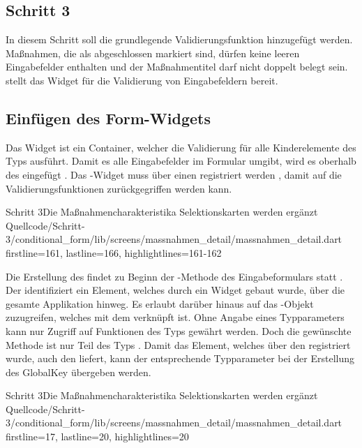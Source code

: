 \clearpage 


\subsection{Schritt 3}

In diesem Schritt soll die grundlegende Validierungsfunktion hinzugefügt werden.
Maßnahmen, die als abgeschlossen markiert sind, dürfen keine leeren Eingabefelder enthalten und der Maßnahmentitel darf nicht doppelt belegt sein.
 stellt das Widget  für die Validierung von Eingabefeldern bereit.

\subsection{Einfügen des Form-Widgets}

Das Widget  ist ein Container, welcher die Validierung für alle Kinderelemente des Typs  ausführt.
Damit es alle Eingabefelder im Formular umgibt, wird es oberhalb des  eingefügt .
Das -Widget muss über einen  registriert werden , damit auf die Validierungsfunktionen zurückgegriffen werden kann.

\begin{alexlisting}{Schritt 3}{Die Maßnahmencharakteristika Selektionskarten werden ergänzt}
    {Quellcode/Schritt-3/conditional_form/lib/screens/massnahmen_detail/massnahmen_detail.dart}
    {firstline=161, lastline=166, highlightlines={161-162}}
    \label{lst:Schritt3Form}
\end{alexlisting}
  
Die Erstellung des  findet zu Beginn der -Methode des Eingabeformulars statt .
Der  identifiziert ein Element, welches durch ein Widget gebaut wurde, über die gesamte Applikation hinweg.
Es erlaubt darüber hinaus auf das -Objekt zuzugreifen, welches mit dem  verknüpft ist.
Ohne Angabe eines Typparameters kann nur Zugriff auf Funktionen des Typs  gewährt werden.
Doch die gewünschte Methode  ist nur Teil des Typs .
Damit das Element, welches über den  registriert wurde, auch den  liefert, kann der entsprechende Typparameter  bei der Erstellung des GlobalKey übergeben werden.

\begin{alexlisting}{Schritt 3}{Die Maßnahmencharakteristika Selektionskarten werden ergänzt}
    {Quellcode/Schritt-3/conditional_form/lib/screens/massnahmen_detail/massnahmen_detail.dart}
    {firstline=17, lastline=20, highlightlines={20}}
    \label{lst:Schritt3FormState}
\end{alexlisting}

